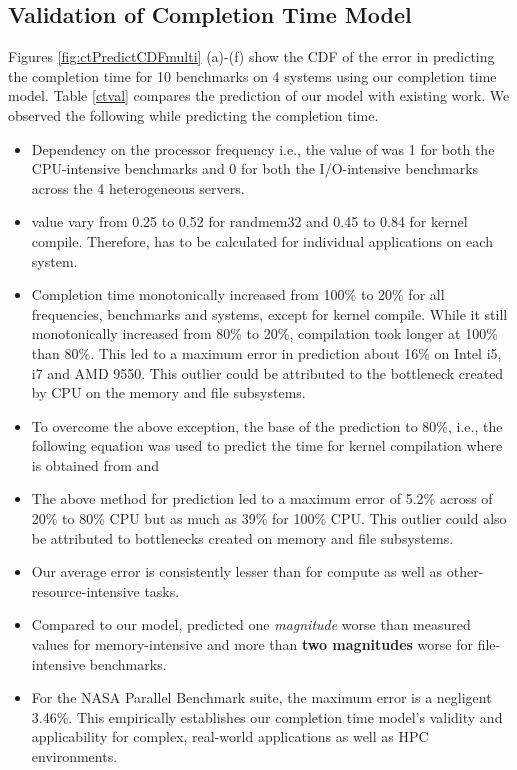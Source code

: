 \documentclass{sig-alternate}
\begin{document}
 \subsection{Validation of Completion Time Model} 
 \label{valCT}
Figures \ref{fig:ctPredictCDFmulti} (a)-(f) show the CDF of the error in predicting the completion time for 10 benchmarks on 4 systems using our completion time model. Table \ref{ctval} compares the prediction of our model  with  existing work. We observed the following while predicting the completion time. 
\begin{itemize}
 \item Dependency on the processor frequency i.e., the value of  was  1 for both the CPU-intensive benchmarks and  0 for both the I/O-intensive benchmarks across the 4 heterogeneous servers.
 \item  value vary from 0.25 to 0.52 for randmem32 and 0.45 to 0.84 for kernel compile. Therefore,  has to be calculated for individual applications on each system. 
\item Completion time monotonically increased from 100\% to 20\% for all frequencies, benchmarks and systems, except for kernel compile. While it still monotonically increased from 80\% to 20\%, compilation took longer at 100\% than 80\%. This led to a maximum error in prediction about 16\% on Intel i5, i7 and AMD 9550. This outlier could be attributed to the bottleneck created by CPU on the memory and file subsystems.
 \item To overcome the above exception, the base of the prediction to 80\%, i.e., the following equation was used to predict the time for kernel compilation where  is obtained from  and 
 
 \item The above method for prediction led to a maximum error of 5.2\% across of 20\% to 80\% CPU but as much as 39\% for 100\% CPU. This outlier could also be attributed to bottlenecks created on memory and file subsystems.
\item Our average error is consistently lesser than \cite{Petrucci2011} for compute as well as other-resource-intensive tasks. 
 \item Compared to our model, \cite{Petrucci2011} predicted one \emph{magnitude} worse than measured values for memory-intensive and more than \textbf{two magnitudes} worse for file-intensive benchmarks.
 \item For the NASA Parallel Benchmark suite, the maximum error is a negligent 3.46\%. This empirically establishes our completion time model's validity and applicability for complex, real-world applications as well as HPC environments.
\end{itemize}
\end{document}
